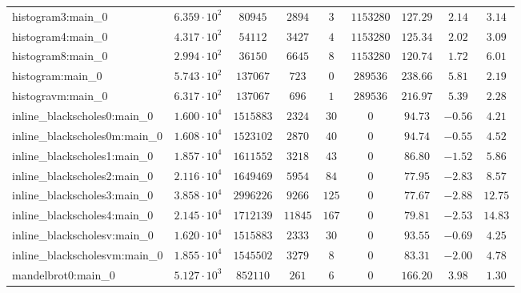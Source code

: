 \begin{tabular}{|l|c|c|c|c|c|c|c|c|}
histogram3:main\_0             & $ 6.359 \cdot 10^{2} $ & $ 80945    $ & $ 2894   $ & $ 3    $ & $ 1153280  $ & $ 127.29      $ & $ 2.14    $ & $ 3.14    $ \\
histogram4:main\_0             & $ 4.317 \cdot 10^{2} $ & $ 54112    $ & $ 3427   $ & $ 4    $ & $ 1153280  $ & $ 125.34      $ & $ 2.02    $ & $ 3.09    $ \\
histogram8:main\_0             & $ 2.994 \cdot 10^{2} $ & $ 36150    $ & $ 6645   $ & $ 8    $ & $ 1153280  $ & $ 120.74      $ & $ 1.72    $ & $ 6.01    $ \\
histogram:main\_0              & $ 5.743 \cdot 10^{2} $ & $ 137067   $ & $ 723    $ & $ 0    $ & $ 289536   $ & $ 238.66      $ & $ 5.81    $ & $ 2.19    $ \\
histogravm:main\_0             & $ 6.317 \cdot 10^{2} $ & $ 137067   $ & $ 696    $ & $ 1    $ & $ 289536   $ & $ 216.97      $ & $ 5.39    $ & $ 2.28    $ \\
inline\_blackscholes0:main\_0  & $ 1.600 \cdot 10^{4} $ & $ 1515883  $ & $ 2324   $ & $ 30   $ & $ 0        $ & $ 94.73       $ & $ -0.56   $ & $ 4.21    $ \\
inline\_blackscholes0m:main\_0 & $ 1.608 \cdot 10^{4} $ & $ 1523102  $ & $ 2870   $ & $ 40   $ & $ 0        $ & $ 94.74       $ & $ -0.55   $ & $ 4.52    $ \\
inline\_blackscholes1:main\_0  & $ 1.857 \cdot 10^{4} $ & $ 1611552  $ & $ 3218   $ & $ 43   $ & $ 0        $ & $ 86.80       $ & $ -1.52   $ & $ 5.86    $ \\
inline\_blackscholes2:main\_0  & $ 2.116 \cdot 10^{4} $ & $ 1649469  $ & $ 5954   $ & $ 84   $ & $ 0        $ & $ 77.95       $ & $ -2.83   $ & $ 8.57    $ \\
inline\_blackscholes3:main\_0  & $ 3.858 \cdot 10^{4} $ & $ 2996226  $ & $ 9266   $ & $ 125  $ & $ 0        $ & $ 77.67       $ & $ -2.88   $ & $ 12.75   $ \\
inline\_blackscholes4:main\_0  & $ 2.145 \cdot 10^{4} $ & $ 1712139  $ & $ 11845  $ & $ 167  $ & $ 0        $ & $ 79.81       $ & $ -2.53   $ & $ 14.83   $ \\
inline\_blackscholesv:main\_0  & $ 1.620 \cdot 10^{4} $ & $ 1515883  $ & $ 2333   $ & $ 30   $ & $ 0        $ & $ 93.55       $ & $ -0.69   $ & $ 4.25    $ \\
inline\_blackscholesvm:main\_0 & $ 1.855 \cdot 10^{4} $ & $ 1545502  $ & $ 3279   $ & $ 8    $ & $ 0        $ & $ 83.31       $ & $ -2.00   $ & $ 4.78    $ \\
mandelbrot0:main\_0            & $ 5.127 \cdot 10^{3} $ & $ 852110   $ & $ 261    $ & $ 6    $ & $ 0        $ & $ 166.20      $ & $ 3.98    $ & $ 1.30    $ \\

\end{tabular}
